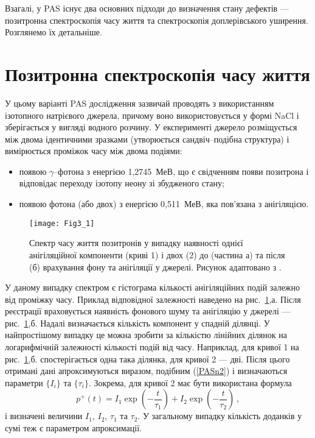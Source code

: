 Взагалі, у PAS існує два основних підходи до визначення стану дефектів ---позитронна спектроскопія часу життя
та спектроскопія доплерівського уширення.
Розглянемо їх детальніше.

\section{Позитронна спектроскопія часу життя}\label{secPAS_PSLT}
У цьому варіанті PAS дослідження зазвичай проводять з використанням ізотопного натрієвого джерела,
причому воно використовується у формі NaCl і зберігається у вигляді водного розчину.
У експерименті джерело розміщується між двома ідентичними зразками
(утворюється сандвіч--подібна структура) і
вимірюється проміжок часу між двома подіями:
\begin{itemize}[leftmargin=0em,itemindent=1.5em]
\item появою $\gamma$--фотона з енергією 1,2745~МеВ, що є свідченням появи позитрона і відповідає переходу ізотопу неону зі збудженого стану;
\item появою фотона (або двох) з енергією 0,511~МеВ, яка пов'язана з анігіляцією.
\end{itemize}

\begin{figure}[b]
\center
\vspace{-2mm}
\texttt{[image: Fig3\_1]}
\vspace{-3mm}
\caption{Спектр часу життя позитронів у випадку наявності однієї анігіляційної компоненти
(криві 1) і двох (2) до (частина а) та після (б) врахування фону та
анігіляції у джерелі.
Рисунок адаптовано з \cite{PAS}.}
\vspace{-3mm}
\label{F31}
\end{figure}

У даному випадку спектром є гістограма кількості анігіляційних подій залежно від проміжку часу.
Приклад відповідної залежності наведено на рис.~\ref{F31},а.
Після реєстрації враховується наявність фонового шуму та анігіляцію у джерелі --- рис.~\ref{F31},б.
Надалі визначається кількість компонент у спадній ділянці.
У найпростішому випадку це можна зробити за кількістю лінійних ділянок на логарифмічній залежності
кількості подій від часу.
Наприклад, для кривої 1 на рис.~\ref{F31},б. спостерігається одна така ділянка,
для кривої 2 --- дві.
Після цього отримані дані апроксимуються виразом, подібним (\ref{PASn2}) і визначаються параметри $\{I_i\}$ та $\{\tau_i\}$.
Зокрема, для кривої 2 має бути використана формула
\begin{equation*}
p^+(t)=I_1\exp\left(-\frac{t}{\tau_1}\right)+I_2\exp\left(-\frac{t}{\tau_2}\right)\,,
\end{equation*}
і визначені величини $I_1$, $I_2$, $\tau_1$ та $\tau_2$.
У загальному випадку кількість доданків у сумі теж є параметром апроксимації.

